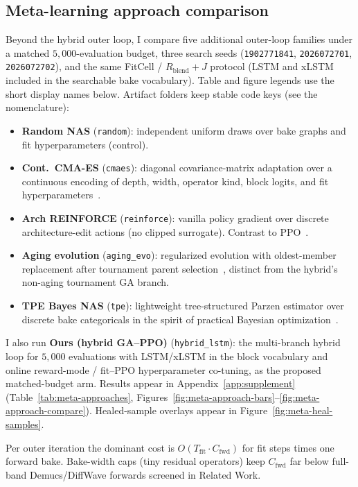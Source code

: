 \subsection{Meta-learning approach comparison}
\label{sec:meta-compare}

Beyond the hybrid outer loop, I compare five additional outer-loop families under a matched $5{,}000$-evaluation budget,
three search seeds (\texttt{1902771841}, \texttt{2026072701}, \texttt{2026072702}), and the same FitCell / $R_{\mathrm{blend}}{+}J$ protocol (LSTM and xLSTM included in the searchable bake vocabulary).
Table and figure legends use the short display names below. Artifact folders keep stable code keys (see the nomenclature):
\begin{itemize}
  \item \textbf{Random NAS} (\texttt{random}): independent uniform draws over bake graphs and fit hyperparameters (control).
  \item \textbf{Cont.\ CMA-ES} (\texttt{cmaes}): diagonal covariance-matrix adaptation over a continuous encoding of depth, width, operator kind, block logits, and fit hyperparameters~\citep{hansen2016cmaes}.
  \item \textbf{Arch REINFORCE} (\texttt{reinforce}): vanilla policy gradient over discrete architecture-edit actions (no clipped surrogate). Contrast to PPO~\citep{schulman2017,zoph2017nas}.
  \item \textbf{Aging evolution} (\texttt{aging\_evo}): regularized evolution with oldest-member replacement after tournament parent selection~\citep{real2017large,real2019}, distinct from the hybrid's non-aging tournament GA branch.
  \item \textbf{TPE Bayes NAS} (\texttt{tpe}): lightweight tree-structured Parzen estimator over discrete bake categoricals in the spirit of practical Bayesian optimization~\citep{snoek2012}.
\end{itemize}
I also run \textbf{Ours (hybrid GA--PPO)} (\texttt{hybrid\_lstm}): the multi-branch hybrid loop for $5{,}000$ evaluations with LSTM/xLSTM in the block vocabulary and online reward-mode / fit--PPO hyperparameter co-tuning, as the proposed matched-budget arm.
Results appear in Appendix~\ref{app:supplement} (Table~\ref{tab:meta-approaches}, Figures~\ref{fig:meta-approach-bars}--\ref{fig:meta-approach-compare}). Healed-sample overlays appear in Figure~\ref{fig:meta-heal-samples}.

\begin{remark}
\label{rem:complexity}
Per outer iteration the dominant cost is $O(T_{\mathrm{fit}}\cdot C_{\mathrm{fwd}})$ for fit steps times one forward bake.
Bake-width caps (tiny residual operators) keep $C_{\mathrm{fwd}}$ far below full-band Demucs/DiffWave forwards screened in Related Work.
\end{remark}

